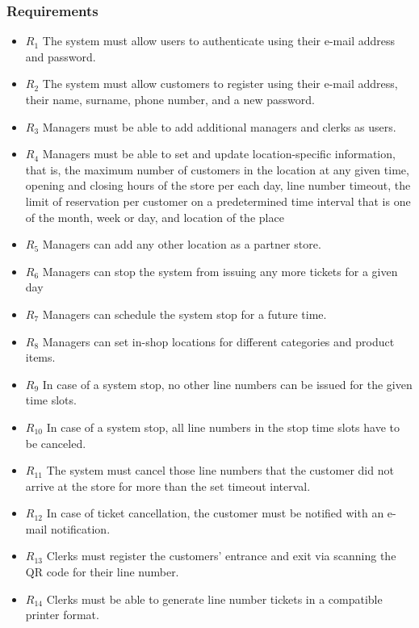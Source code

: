 \subsubsection{Requirements}
\begin{itemize}
    \item \textbf{$R_{1}$} The system must allow users to authenticate using their e-mail address and password.
    \item \textbf{$R_{2}$} The system must allow customers to register using their e-mail address, their name, surname, phone number, and a new password.
    \item \textbf{$R_{3}$} Managers must be able to add additional managers and clerks as users.
    \item \textbf{$R_{4}$} Managers must be able to set and update location-specific information, that is, the maximum number of customers in the location at any given time, opening and closing hours of the store per each day, line number timeout, the limit of reservation per customer on a predetermined time interval that is one of the month, week or day, and location of the place %
    \item \textbf{$R_{5}$} Managers can add any other location as a partner store.
    \item \textbf{$R_{6}$} Managers can stop the system from issuing any more tickets for a given day
    \item \textbf{$R_{7}$} Managers can schedule the system stop for a future time.
    \item \textbf{$R_{8}$} Managers can set in-shop locations for different categories and product items.
    \item \textbf{$R_{9}$} In case of a system stop, no other line numbers can be issued for the given time slots.
    \item \textbf{$R_{10}$} In case of a system stop, all line numbers in the stop time slots have to be canceled.
    \item \textbf{$R_{11}$} The system must cancel those line numbers that the customer did not arrive at the store for more than the set timeout interval.
    \item \textbf{$R_{12}$} In case of ticket cancellation, the customer must be notified with an e-mail notification.
    \item \textbf{$R_{13}$} Clerks must register the customers' entrance and exit via scanning the QR code for their line number.
    \item \textbf{$R_{14}$} Clerks must be able to generate line number tickets in a compatible printer format.

\end{itemize}
